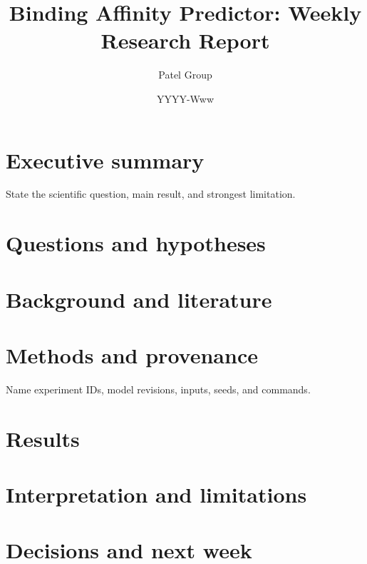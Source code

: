 \documentclass[11pt]{article}
\title{Binding Affinity Predictor: Weekly Research Report}
\author{Patel Group}
\date{YYYY-Www}
\begin{document}
\maketitle

\section*{Executive summary}
State the scientific question, main result, and strongest limitation.

\section{Questions and hypotheses}

\section{Background and literature}

\section{Methods and provenance}
Name experiment IDs, model revisions, inputs, seeds, and commands.

\section{Results}

\section{Interpretation and limitations}

\section{Decisions and next week}



\end{document}
